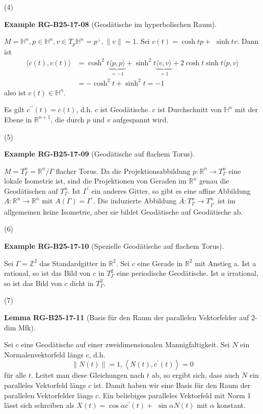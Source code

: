 \documentclass[10pt, letterpaper]{article}
\newcommand{\CustomHeading}[3]{%
  \par\medskip\noindent%
  \textbf{#1 #2} \textnormal{(#3)}.\enskip%
}
\newenvironment{LEM}[2]{\begin{unitbox}\CustomHeading{Lemma}{#1}{#2}}{\end{unitbox}}
\newenvironment{EXA}[2]{\begin{unitbox}\CustomHeading{Example}{#1}{#2}}{\end{unitbox}}
\begin{document}
(4) 


\begin{EXA}{RG-B25-17-08}{Geodätische im hyperbolischen Raum}
$M=\mathbb{H}^{n}, p \in \mathbb{H}^{n}, v \in T_{p} \mathbb{H}^{n}=p^{\perp},\|v\|=1$. Sei $c(t)=\cosh t p+$ $\sinh t v$. Dann ist
$$
\begin{aligned}
\langle c(t), c(t)\rangle & =\cosh ^{2} t \underbrace{\langle p, p\rangle}_{=-1}+\sinh ^{2} t \underbrace{\langle v, v\rangle}_{=1}+2 \cosh t \sinh t\langle p, v\rangle \\
& =-\cosh ^{2} t+\sinh ^{2} t=-1
\end{aligned}
$$
also ist $c(t) \in \mathbb{H}^{n}$.

Es gilt $c^{\prime \prime}(t)=c(t)$, d.h. $c$ ist Geodätische. $c$ ist Durchschnitt von $\mathbb{H}^{n}$ mit der Ebene in $\mathbb{R}^{n+1}$, die durch $p$ und $v$ aufgespannt wird.
\end{EXA}


(5) 


\begin{EXA}{RG-B25-17-09}{Geodätische auf flachem Torus}
$M=T_{\Gamma}^{n}=\mathbb{R}^{n} / \Gamma$ flacher Torus. Da die Projektionsabbildung $p: \mathbb{R}^{n} \rightarrow T_{\Gamma}^{n}$ eine lokale Isometrie ist, sind die Projektionen von Geraden im $\mathbb{R}^{n}$ genau die Geodätischen auf $T_{\Gamma}^{n}$. Ist $\Gamma^{\prime}$ ein anderes Gitter, so gibt es eine affine Abbildung $A: \mathbb{R}^{n} \rightarrow \mathbb{R}^{n}$ mit $A(\Gamma)=\Gamma^{\prime}$. Die induzierte Abbildung $\bar{A}: T_{\Gamma}^{n} \rightarrow T_{\Gamma^{\prime}}^{n}$ ist im allgemeinen keine Isometrie, aber sie bildet Geodätische auf Geodätische ab.
\end{EXA}


(6) 

\begin{EXA}{RG-B25-17-10}{Spezielle Geodätische auf flachem Torus}
Sei $\Gamma=\mathbb{Z}^{2}$ das Standardgitter in $\mathbb{R}^{2}$. Sei $c$ eine Gerade in $\mathbb{R}^{2}$ mit Anstieg a. Ist a rational, so ist das Bild von $c$ in $T_{\Gamma}^{2}$ eine periodische Geodätische. Ist $a$ irrational, so ist das Bild von $c$ dicht in $T_{\Gamma}^{2}$.
\end{EXA}


(7) 

\begin{LEM}{RG-B25-17-11}{Basis für den Raum der parallelen Vektorfelder auf 2-dim Mfk}
Sei $c$ eine Geodätische auf einer zweidimensionalen Mannigfaltigkeit. Sei $N$ ein Normalenvektorfeld längs $c$, d.h. 
$$\|N(t)\|=1,\left\langle N(t), c^{\prime}(t)\right\rangle=0$$ 
für alle $t$. Leitet man diese Gleichungen nach $t$ ab, so ergibt sich, dass auch $N$ ein paralleles Vektorfeld längs $c$ ist. Damit haben wir eine Basis für den Raum der parallelen Vektorfelder längs $c$. Ein beliebiges paralleles Vektorfeld mit Norm 1 lässt sich schreiben als $X(t)=\cos \alpha c^{\prime}(t)+$ $\sin \alpha N(t)$ mit $\alpha$ konstant.
\end{LEM}
\end{document}
